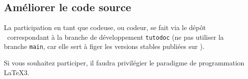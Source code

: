 \documentclass[10pt, a4paper]{../main/main}
\begin{document}

\subsection{Améliorer le code source}

La participation en tant que codeuse, ou codeur, se fait via le dépôt \thisrepo\ correspondant à la branche de développement \verb#tutodoc# (ne pas utiliser la branche \verb#main#, car elle sert à figer les versions stables publiées sur \ctan).


\begin{tdocimp}
	Si vous souhaitez participer, il faudra privilégier le paradigme de programmation \LaTeX3.
\end{tdocimp}
\end{document}
